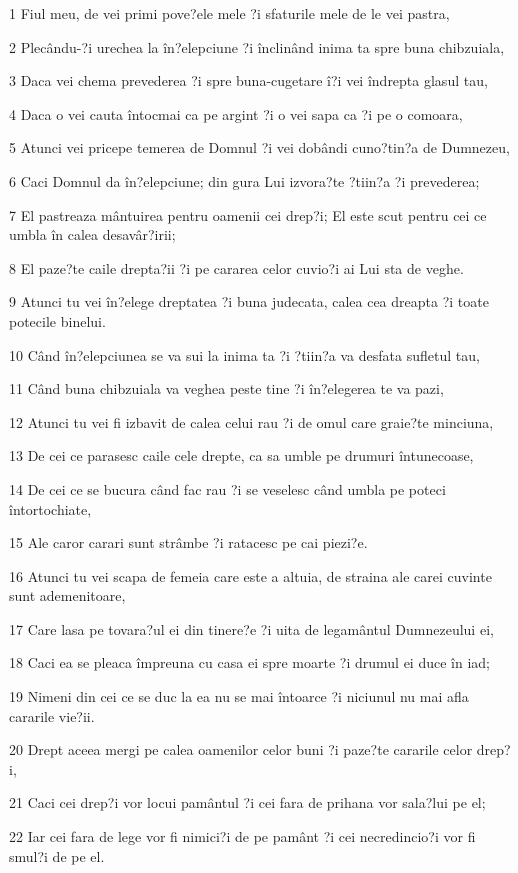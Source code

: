 \par 1 Fiul meu, de vei primi pove?ele mele ?i sfaturile mele de le vei pastra,
\par 2 Plecându-?i urechea la în?elepciune ?i înclinând inima ta spre buna chibzuiala,
\par 3 Daca vei chema prevederea ?i spre buna-cugetare î?i vei îndrepta glasul tau,
\par 4 Daca o vei cauta întocmai ca pe argint ?i o vei sapa ca ?i pe o comoara,
\par 5 Atunci vei pricepe temerea de Domnul ?i vei dobândi cuno?tin?a de Dumnezeu,
\par 6 Caci Domnul da în?elepciune; din gura Lui izvora?te ?tiin?a ?i prevederea;
\par 7 El pastreaza mântuirea pentru oamenii cei drep?i; El este scut pentru cei ce umbla în calea desavâr?irii;
\par 8 El paze?te caile drepta?ii ?i pe cararea celor cuvio?i ai Lui sta de veghe.
\par 9 Atunci tu vei în?elege dreptatea ?i buna judecata, calea cea dreapta ?i toate potecile binelui.
\par 10 Când în?elepciunea se va sui la inima ta ?i ?tiin?a va desfata sufletul tau,
\par 11 Când buna chibzuiala va veghea peste tine ?i în?elegerea te va pazi,
\par 12 Atunci tu vei fi izbavit de calea celui rau ?i de omul care graie?te minciuna,
\par 13 De cei ce parasesc caile cele drepte, ca sa umble pe drumuri întunecoase,
\par 14 De cei ce se bucura când fac rau ?i se veselesc când umbla pe poteci întortochiate,
\par 15 Ale caror carari sunt strâmbe ?i ratacesc pe cai piezi?e.
\par 16 Atunci tu vei scapa de femeia care este a altuia, de straina ale carei cuvinte sunt ademenitoare,
\par 17 Care lasa pe tovara?ul ei din tinere?e ?i uita de legamântul Dumnezeului ei,
\par 18 Caci ea se pleaca împreuna cu casa ei spre moarte ?i drumul ei duce în iad;
\par 19 Nimeni din cei ce se duc la ea nu se mai întoarce ?i niciunul nu mai afla cararile vie?ii.
\par 20 Drept aceea mergi pe calea oamenilor celor buni ?i paze?te cararile celor drep?i,
\par 21 Caci cei drep?i vor locui pamântul ?i cei fara de prihana vor sala?lui pe el;
\par 22 Iar cei fara de lege vor fi nimici?i de pe pamânt ?i cei necredincio?i vor fi smul?i de pe el.

